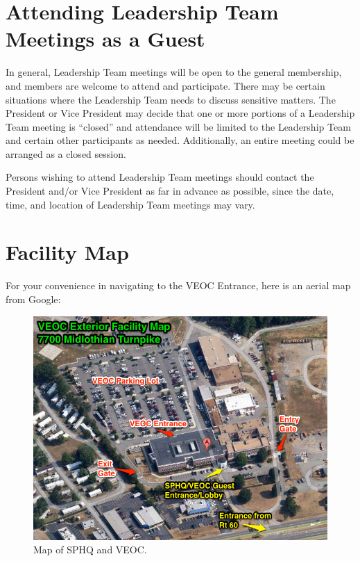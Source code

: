 \documentclass[pdflatex,letterpaper,twoside,12pt]{book}
\begin{document}
\section {Attending Leadership Team Meetings as a Guest}

In general, Leadership Team meetings will be open to the general membership, and members are welcome to attend and participate.  There may be certain situations where the Leadership Team needs to discuss sensitive matters.  The President or Vice President may decide that one or more portions of a Leadership Team meeting is ``closed'' and attendance will be limited to the Leadership Team and certain other participants as needed.  Additionally, an entire meeting could be arranged as a closed session.

Persons wishing to attend Leadership Team meetings should contact the President and/or Vice President as far in advance as possible, since the date, time, and location of Leadership Team meetings may vary.


\section{Facility Map}

For your convenience in navigating to the VEOC Entrance, here is an aerial map from Google:

\begin{figure}[h!]
  \centering
  \includegraphics[width=\textwidth,keepaspectratio=true]{resources/veoc_map}
  \caption{Map of SPHQ and VEOC.\label{fig:ops-main-screen}}
\end{figure}
\end{document}
